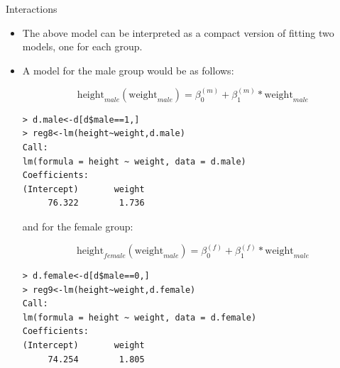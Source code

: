 \documentclass[handout]{beamer}
\begin{document}
\begin{frame}[fragile]{Interactions}
\scriptsize{ 
\begin{itemize}
\item The above model can be interpreted as a compact version of fitting two models, one for each group.

\item A model for the male group would be as follows:


  \begin{displaymath}
  \text{height}_{male}(\text{weight}_{male})=\beta_0^{(m)}+\beta_1^{(m)}*\text{weight}_{male}
 \end{displaymath}
 
 \begin{verbatim}
> d.male<-d[d$male==1,]
> reg8<-lm(height~weight,d.male)
Call:
lm(formula = height ~ weight, data = d.male)
Coefficients:
(Intercept)       weight  
     76.322        1.736  
\end{verbatim} 

and for the female group:
 
   \begin{displaymath}
  \text{height}_{female}(\text{weight}_{male})=\beta_0^{(f)}+\beta_1^{(f)}*\text{weight}_{male}
 \end{displaymath}


\begin{verbatim}
> d.female<-d[d$male==0,]     
> reg9<-lm(height~weight,d.female)
Call:
lm(formula = height ~ weight, data = d.female)
Coefficients:
(Intercept)       weight  
     74.254        1.805  
\end{verbatim} 

 
\end{itemize}




}
\end{frame}
\end{document}
